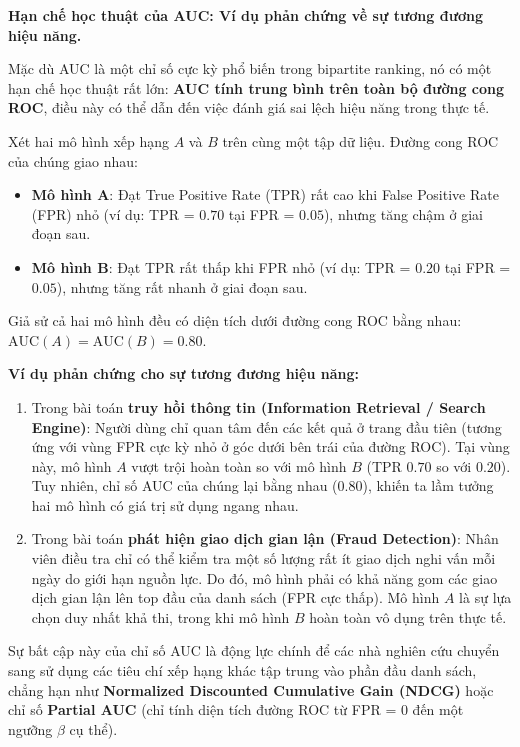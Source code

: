 \begin{morong}
\textbf{Hạn chế học thuật của AUC: Ví dụ phản chứng về sự tương đương hiệu năng.}

Mặc dù AUC là một chỉ số cực kỳ phổ biến trong bipartite ranking, nó có một hạn chế học thuật rất lớn: \textbf{AUC tính trung bình trên toàn bộ đường cong ROC}, điều này có thể dẫn đến việc đánh giá sai lệch hiệu năng trong thực tế.

Xét hai mô hình xếp hạng $A$ và $B$ trên cùng một tập dữ liệu. Đường cong ROC của chúng giao nhau:
\begin{itemize}
    \item \textbf{Mô hình A}: Đạt True Positive Rate (TPR) rất cao khi False Positive Rate (FPR) nhỏ (ví dụ: TPR = $0.70$ tại FPR = $0.05$), nhưng tăng chậm ở giai đoạn sau.
    \item \textbf{Mô hình B}: Đạt TPR rất thấp khi FPR nhỏ (ví dụ: TPR = $0.20$ tại FPR = $0.05$), nhưng tăng rất nhanh ở giai đoạn sau.
\end{itemize}
Giả sử cả hai mô hình đều có diện tích dưới đường cong ROC bằng nhau: $\text{AUC}(A) = \text{AUC}(B) = 0.80$. 

\textbf{Ví dụ phản chứng cho sự tương đương hiệu năng:}
\begin{enumerate}
    \item Trong bài toán \textbf{truy hồi thông tin (Information Retrieval / Search Engine)}: Người dùng chỉ quan tâm đến các kết quả ở trang đầu tiên (tương ứng với vùng FPR cực kỳ nhỏ ở góc dưới bên trái của đường ROC). Tại vùng này, mô hình $A$ vượt trội hoàn toàn so với mô hình $B$ (TPR $0.70$ so với $0.20$). Tuy nhiên, chỉ số AUC của chúng lại bằng nhau ($0.80$), khiến ta lầm tưởng hai mô hình có giá trị sử dụng ngang nhau.
    \item Trong bài toán \textbf{phát hiện giao dịch gian lận (Fraud Detection)}: Nhân viên điều tra chỉ có thể kiểm tra một số lượng rất ít giao dịch nghi vấn mỗi ngày do giới hạn nguồn lực. Do đó, mô hình phải có khả năng gom các giao dịch gian lận lên top đầu của danh sách (FPR cực thấp). Mô hình $A$ là sự lựa chọn duy nhất khả thi, trong khi mô hình $B$ hoàn toàn vô dụng trên thực tế.
\end{enumerate}

Sự bất cập này của chỉ số AUC là động lực chính để các nhà nghiên cứu chuyển sang sử dụng các tiêu chí xếp hạng khác tập trung vào phần đầu danh sách, chẳng hạn như \textbf{Normalized Discounted Cumulative Gain (NDCG)} hoặc chỉ số \textbf{Partial AUC} (chỉ tính diện tích đường ROC từ FPR = $0$ đến một ngưỡng $\beta$ cụ thể).
\end{morong}

